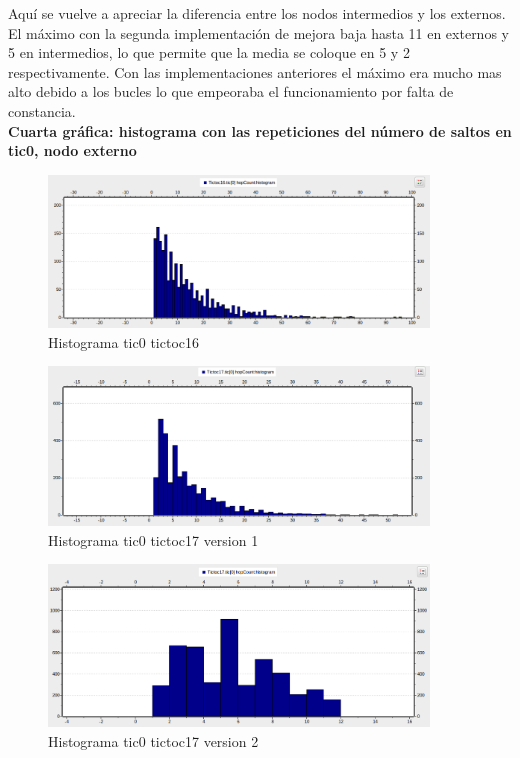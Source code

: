 \documentclass{article}
\begin{document}
			
		Aquí se vuelve a apreciar la diferencia entre los nodos intermedios y los externos. El máximo con la segunda implementación de mejora baja hasta 11 en externos y 5 en intermedios, lo que permite que la media se coloque en 5 y 2 respectivamente. Con las implementaciones anteriores el máximo era mucho mas alto debido a los bucles lo que empeoraba el funcionamiento por falta de constancia.\\
		
		
		\textbf{Cuarta gráfica: histograma con las repeticiones del número de saltos en tic0, nodo externo}\\
		
		\begin{figure}[htb]
			\centering
			\includegraphics[width=0.9\textwidth]{tictoc16/figura4.png}
			\caption{Histograma tic0 tictoc16}
			\end {figure}
		
		\newpage
		
		\begin{figure}[htb]
			\centering
			\includegraphics[width=0.9\textwidth]{tictoc17v1/figura4.png}
			\caption{Histograma tic0 tictoc17 version 1}
			\end {figure}		
		
		\begin{figure}[htb]
			\centering
			\includegraphics[width=0.9\textwidth]{tictoc17v2/figura4.png}
			\caption{Histograma tic0 tictoc17 version 2}
			\end {figure}
			
\end{document}
